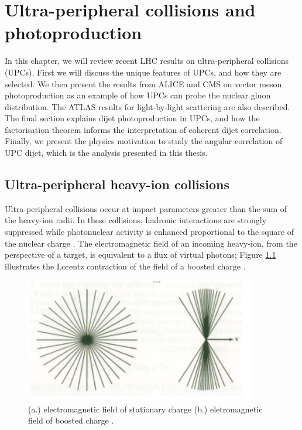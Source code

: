 \setlength\abovedisplayskip{0.4pt}
\setlength\belowdisplayskip{0.4pt}

\chapter{Ultra-peripheral collisions and photoproduction}

In this chapter, we will review recent LHC results on ultra-peripheral collisions (UPCs). First we will discuss the unique features of UPCs, and how they are selected. We then present the results from ALICE and CMS on vector meson photoproduction as an example of how UPCs can probe the nuclear gluon distribution. The ATLAS results for light-by-light scattering are also described. The final section explains dijet photoproduction in UPCs, and how the factorisation theorem informs the interpretation of coherent dijet correlation. Finally, we present the physics motivation to study the angular correlation of UPC dijet, which is the analysis presented in this thesis. 

\section{Ultra-peripheral heavy-ion collisions}

Ultra-peripheral collisions occur at impact parameters greater than the sum of the heavy-ion radii. In these collisions, hadronic interactions are strongly suppressed while photonuclear activity is enhanced proportional to the square of the nuclear charge \cite{Contreras:2015dqa}. The electromagnetic field of an incoming heavy-ion, from the perspective of a target, is equivalent to a flux of virtual photons; Figure \ref{fig:smushedField} illustrates the Lorentz contraction of the field of a boosted charge \cite{Baltz:2007kq,WWJackson}.

\begin{figure}[h!]
\begin{centering}
\includegraphics[width=4in]{Chapter1/importfigs/jackson_em_wwa.png}
\par\end{centering}
\caption{ (a.) electromagnetic field of stationary charge (b.) eletromagnetic field of boosted charge \cite{WWJackson}. \label{fig:smushedField}}
\end{figure}

